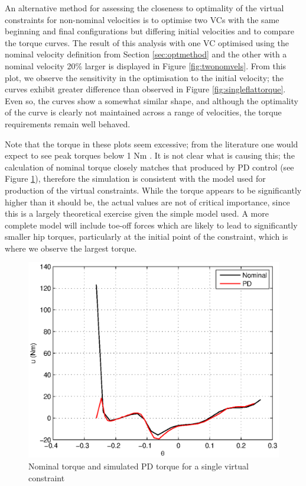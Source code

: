 An alternative method for assessing the closeness to optimality of the virtual constraints for non-nominal velocities is to optimise two VCs with the same beginning and final configurations but differing initial velocities and to compare the torque curves. The result of this analysis with one VC optimised using the nominal velocity definition from Section \ref{sec:optmethod} and the other with a nominal velocity 20\% larger is displayed in Figure \ref{fig:twonomvels}. From this plot, we observe the sensitivity in the optimisation to the initial velocity; the curves exhibit greater difference than observed in Figure \ref{fig:singleflattorque}. Even so, the curves show a somewhat similar shape, and although the optimality of the curve is clearly not maintained across a range of velocities, the torque requirements remain well behaved.

Note that the torque in these plots seem excessive; from the literature one would expect to see peak torques below 1 Nm \cite{westervelt2007feedback, collins2005efficient}. It is not clear what is causing this; the calculation of nominal torque closely matches that produced by PD control (see Figure \ref{fig:pdmatchesnom}), therefore the simulation is consistent with the model used for production of the virtual constraints. While the torque appears to be significantly higher than it should be, the actual values are not of critical importance, since this is a largely theoretical exercise given the simple model used. A more complete model will include toe-off forces which are likely to lead to significantly smaller hip torques, particularly at the initial point of the constraint, which is where we observe the largest torque.

\begin{figure}
\centering
\includegraphics[width=0.6\linewidth]{7Results/pdmatchesnom}
\caption{Nominal torque and simulated PD torque for a single virtual constraint}
\label{fig:pdmatchesnom}
\end{figure}


